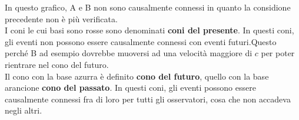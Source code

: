In questo grafico, A e B non sono causalmente connessi in quanto la considione precedente non è
più verificata.\\
I coni le cui basi sono rosse sono denominati \textbf{coni del presente}. In questi coni, gli 
eventi non possono essere causalmente connessi con eventi futuri.Questo perché B ad esempio 
dovrebbe muoversi ad una velocità maggiore di $c$ per poter rientrare nel cono del futuro.\\
Il cono con la base azurra è definito \textbf{cono del futuro}, quello con la base arancione
\textbf{cono del passato}. In questi coni, gli eventi possono essere causalmente connessi fra di 
loro per tutti gli osservatori, cosa che non accadeva negli altri.
